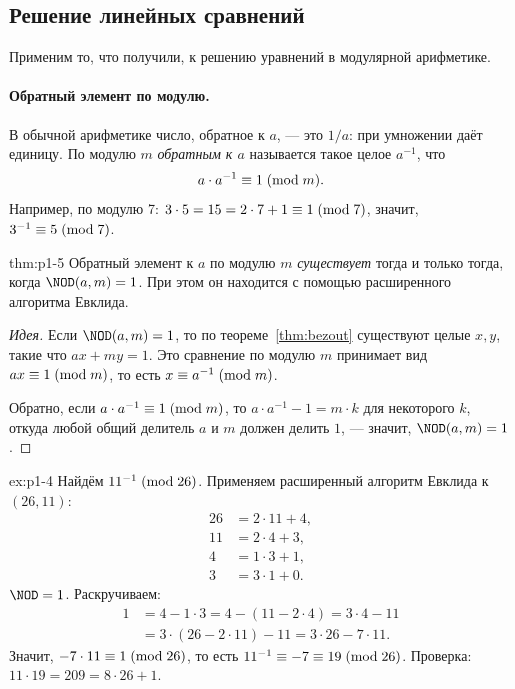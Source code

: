 \subsection{Решение линейных сравнений}

Применим то, что получили, к решению уравнений в модулярной арифметике.

\paragraph*{Обратный элемент по модулю.} В обычной арифметике число, обратное к $a$, --- это $1/a$: при умножении даёт единицу. По модулю $m$ \emph{обратным к $a$} называется такое целое $a^{-1}$, что
\[
a \cdot a^{-1} \equiv 1 \;(\mathrm{mod}\;m).
\]
Например, по модулю 7: $3\cdot 5 = 15 = 2\cdot 7 + 1 \equiv 1 \;(\mathrm{mod}\;7)$, значит, $3^{-1} \equiv 5 \;(\mathrm{mod}\;7)$.

\begin{theorem}{}{thm:p1-5}
Обратный элемент к $a$ по модулю $m$ \emph{существует} тогда и только тогда, когда $\NOD(a, m) = 1$. При этом он находится с помощью расширенного алгоритма Евклида.
\end{theorem}

\begin{proof}[Идея]
Если $\NOD(a,m) = 1$, то по теореме~\ref{thm:bezout} существуют целые $x, y$, такие что $ax + my = 1$. Это сравнение по модулю $m$ принимает вид $ax \equiv 1 \;(\mathrm{mod}\;m)$, то есть $x \equiv a^{-1} \;(\mathrm{mod}\;m)$.

Обратно, если $a\cdot a^{-1} \equiv 1 \;(\mathrm{mod}\;m)$, то $a \cdot a^{-1} - 1 = m\cdot k$ для некоторого $k$, откуда любой общий делитель $a$ и $m$ должен делить $1$, --- значит, $\NOD(a,m) = 1$.
\end{proof}

\begin{example}{}{ex:p1-4}
Найдём $11^{-1} \;(\mathrm{mod}\;26)$. Применяем расширенный алгоритм Евклида к $(26,11)$:
\begin{align*}
26 &= 2\cdot 11 + 4,\\
11 &= 2\cdot 4 + 3,\\
4 &= 1\cdot 3 + 1,\\
3 &= 3\cdot 1 + 0.
\end{align*}
$\NOD = 1$. Раскручиваем:
\begin{align*}
1 &= 4 - 1\cdot 3 = 4 - (11 - 2\cdot 4) = 3\cdot 4 - 11\\
&= 3\cdot (26 - 2\cdot 11) - 11 = 3\cdot 26 - 7\cdot 11.
\end{align*}
Значит, $-7\cdot 11 \equiv 1 \;(\mathrm{mod}\;26)$, то есть $11^{-1} \equiv -7 \equiv 19 \;(\mathrm{mod}\;26)$. Проверка: $11\cdot 19 = 209 = 8\cdot 26 + 1$.
\end{example}

